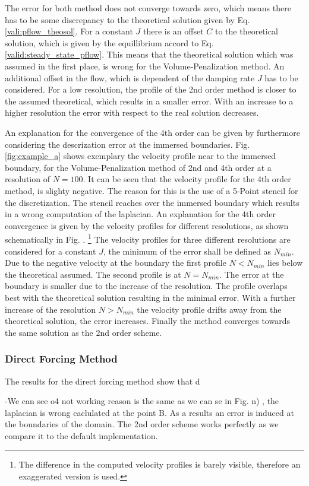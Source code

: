 The error for both method does not converge towards zero, which means there has to be some discrepancy to the theoretical solution given by
Eq. \ref{vali:pflow_theosol}.
For a constant $J$ there is an offset $C$ to the theoretical solution,
which is given by the equillibrium accord to Eq.  \ref{valid:steady_state_pflow}.
This means that the theoretical solution which was assumed in the first place, is wrong for the Volume-Penalization method.
An additional offset in the flow, which is dependent of the damping rate $J$ has to be considered.
For a low resolution, the profile of the 2nd order method is closer to the assumed theoretical, which results in a smaller
error. With an increase to a higher resolution the error with respect to the real solution decreases.

An explanation for the convergence of the 4th order can be given by furthermore considering the descrization error at the immersed boundaries.
Fig. \ref{fig:example_a} shows exemplary the velocity profile near to the immersed boundary, for the Volume-Penalization method of 2nd and 4th order
at a resolution of $N=100$.
It can be seen that the velocity profile for the 4th order method, is slighty negative.
The reason for this is the use of a 5-Point stencil for the discretization.
The stencil reaches over the immersed boundary which results in a wrong computation of the laplacian.
An explanation for the 4th order convergence is given by the velocity profiles for different resolutions,
as shown schematically in Fig. \label{fig:example_b}.
\footnote{The difference in the computed velocity profiles is barely visible, therefore an exaggerated version is used.}
The velocity profiles for three different resolutions are considered for a constant $J$,
the minimum of the error shall be defined as $N_{min}$.
Due to the negative velocity at the boundary the first profile $N<N_{min}$ lies below the theoretical assumed.
The second profile is at $N=N_{min}$. The error at the boundary is smaller due to the increase of the resolution.
The profile overlaps best with the theoretical solution resulting in the minimal error.
With a further increase of the resolution  $N>N_{min}$ the velocity profile drifts away from the theoretical solution,
the error increases.  Finally the method converges towards the same solution as the 2nd order scheme.


\subsubsection{Direct Forcing Method}

The results for the direct forcing method show that d


-We can see o4 not working reason is the same as we can se in Fig. n) , the laplacian is wrong caclulated at the point B.
As a results an error is induced at the boundaries of the domain.
The 2nd order scheme works perfectly as we compare it to the default implementation.

